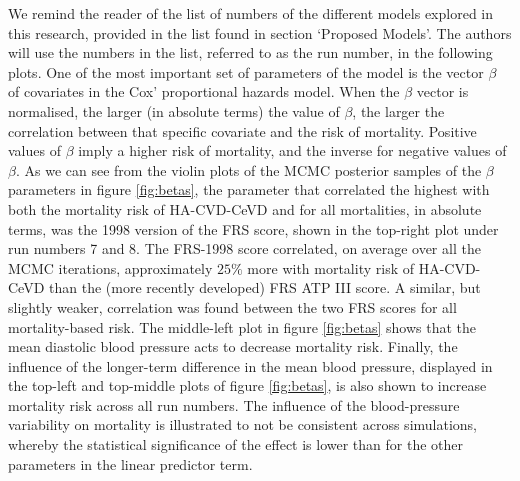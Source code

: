 \documentclass[
]{article}
\begin{document}
We remind the reader of the list of numbers of the different models explored in this research, provided in the list found in section `Proposed Models'. The authors will use the numbers in the list, referred to as the run number, in the following plots. One of the most important set of parameters of the model is the vector \(\beta\) of covariates in the Cox' proportional hazards model. When the \(\beta\) vector is normalised, the larger (in absolute terms) the value of \(\beta\), the larger the correlation between that specific covariate and the risk of mortality. Positive values of \(\beta\) imply a higher risk of mortality, and the inverse for negative values of \(\beta\). As we can see from the violin plots of the MCMC posterior samples of the \(\beta\) parameters in figure \ref{fig:betas}, the parameter that correlated the highest with both the mortality risk of HA-CVD-CeVD and for all mortalities, in absolute terms, was the 1998 version of the FRS score, shown in the top-right plot under run numbers 7 and 8. The FRS-1998 score correlated, on average over all the MCMC iterations, approximately \(25\%\) more with mortality risk of HA-CVD-CeVD than the (more recently developed) FRS ATP III score. A similar, but slightly weaker, correlation was found between the two FRS scores for all mortality-based risk. The middle-left plot in figure \ref{fig:betas} shows that the mean diastolic blood pressure acts to decrease mortality risk. Finally, the influence of the longer-term difference in the mean blood pressure, displayed in the top-left and top-middle plots of figure \ref{fig:betas}, is also shown to increase mortality risk across all run numbers. The influence of the blood-pressure variability on mortality is illustrated to not be consistent across simulations, whereby the statistical significance of the effect is lower than for the other parameters in the linear predictor term.
\end{document}

